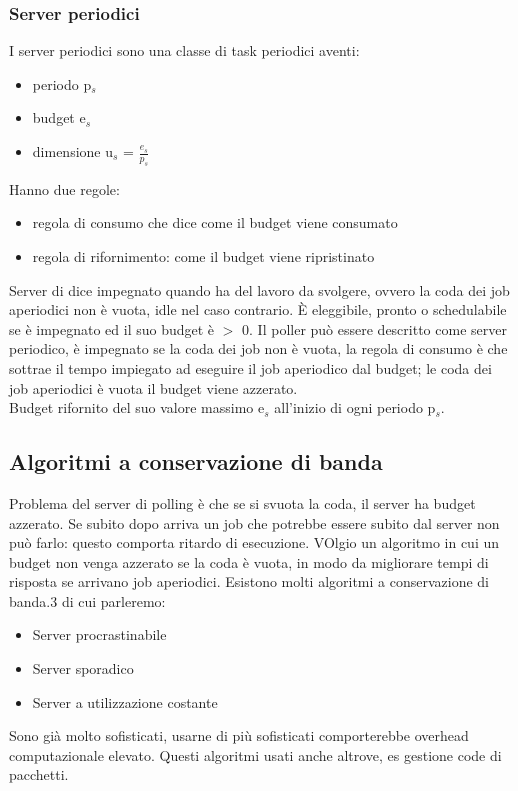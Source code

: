 \documentclass[12pt, oneside]{extbook}
\begin{document}
\subsubsection{Server periodici}
I server periodici sono una classe di task periodici aventi:
\begin{itemize}
\item periodo p$_{s}$
\item budget e$_{s}$
\item dimensione u$_{s}$ = $\frac{e_{s}}{p_{s}}$
\end{itemize}
Hanno due regole:
\begin{itemize}
\item regola di consumo che dice come il budget viene consumato
\item regola di rifornimento: come il budget viene ripristinato
\end{itemize}
Server di dice impegnato quando ha del lavoro da svolgere, ovvero la coda dei job aperiodici non è vuota, idle nel caso contrario. È eleggibile, pronto o schedulabile se è impegnato ed il suo budget è $>$ 0. Il poller può essere descritto come server periodico, è impegnato se la coda dei job non è vuota, la regola di consumo è che sottrae il tempo impiegato ad eseguire il job aperiodico dal budget; le coda dei job aperiodici è vuota il budget viene azzerato.\\ Budget rifornito del suo valore massimo e$_{s}$ all'inizio di ogni periodo p$_{s}$.
\subsection{Algoritmi a conservazione di banda}
Problema del server di polling è che se si svuota la coda, il server ha budget azzerato. Se subito dopo arriva un job che potrebbe essere subito  dal server non può farlo: questo comporta ritardo di esecuzione. VOlgio un algoritmo in cui un budget non venga azzerato se la coda è vuota, in modo da migliorare tempi di risposta se arrivano job aperiodici. Esistono molti algoritmi a conservazione di banda.3 di cui parleremo:
\begin{itemize}
\item Server procrastinabile
\item Server sporadico
\item Server a utilizzazione costante
\end{itemize}
Sono già molto sofisticati, usarne di più sofisticati comporterebbe overhead computazionale elevato. Questi algoritmi usati anche altrove, es gestione code di pacchetti.
\end{document}
